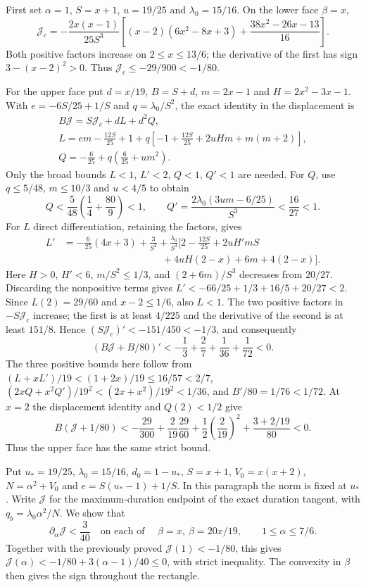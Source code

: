  First set $\alpha=1$, $S=x+1$,
$u=19/25$ and $\lambda_0=15/16$. On the lower face $\beta=x$,
\[
 \mathcal J_c=-\frac{2x(x-1)}{25S^3}
 \left[(x-2)(6x^2-8x+3)+\frac{38x^2-26x-13}{16}\right].
\]
Both positive factors increase on $2\le x\le13/6$; the derivative of the first
has sign $3-(x-2)^2>0$. Thus $\mathcal J_c\le-29/900<-1/80$.

For the upper face put $d=x/19$, $B=S+d$, $m=2x-1$ and
$H=2x^2-3x-1$. With $e=-6S/25+1/S$ and $q=\lambda_0/S^2$, the exact
identity in the displacement is
\begin{gather*}
 B\mathcal J=S\mathcal J_c+dL+d^2Q,\\
 L=em-\frac{12S}{25}+1
       +q\left[-1+\frac{12S}{25}+2uHm+m(m+2)\right],\\
 Q=-\frac6{25}+q\left(\frac6{25}+um^2\right).
\end{gather*}
Only the broad bounds $L<1$, $L'<2$, $Q<1$, $Q'<1$ are needed.
For $Q$, use $q\le5/48$, $m\le10/3$ and $u<4/5$ to obtain
\[
 Q<\frac5{48}\left(\frac14+\frac{80}{9}\right)<1,
 \qquad Q'=\frac{2\lambda_0(3um-6/25)}{S^3}<\frac{16}{27}<1.
\]
For $L$ direct differentiation, retaining the factors, gives
\begin{align*}
 L'&=-\frac6{25}(4x+3)+\frac3{S^2}
 +\frac{\lambda_0}{S^3}
   \bigl[2-\frac{12S}{25}+2uH'mS\\
 &\hspace{10em}+4uH(2-x)+6m+4(2-x)\bigr].
\end{align*}
Here $H>0$, $H'<6$, $m/S^2\le1/3$, and $(2+6m)/S^3$ decreases from $20/27$.
Discarding the nonpositive terms gives
$L'<-66/25+1/3+16/5+20/27<2$.
Since $L(2)=29/60$ and $x-2\le1/6$, also $L<1$.
The two positive factors in $-S\mathcal J_c$ increase; the first is at least $4/225$
and the derivative of the second is at least $151/8$.
Hence $(S\mathcal J_c)'<-151/450<-1/3$, and consequently
\[
 (B\mathcal J+B/80)'
 <-\frac13+\frac27+\frac1{36}+\frac1{72}<0.
\]
The three positive bounds here follow from
$(L+xL')/19<(1+2x)/19\le16/57<2/7$,
$(2xQ+x^2Q')/19^2<(2x+x^2)/19^2<1/36$, and $B'/80=1/76<1/72$.
At $x=2$ the displacement identity and $Q(2)<1/2$ give
\[
 B(\mathcal J+1/80)
 <-\frac{29}{300}+\frac2{19}\frac{29}{60}
      +\frac12\left(\frac2{19}\right)^2+\frac{3+2/19}{80}<0.
\]
Thus the upper face has the same strict bound.


Put $u_*=19/25$, $\lambda_0=15/16$, $d_0=1-u_*$,
$S=x+1$, $V_0=x(x+2)$, $N=\alpha^2+V_0$ and
$e=S(u_*-1)+1/S$. In this paragraph the norm is fixed at $u_*$.
Write $\mathcal J$ for the maximum-duration endpoint of the exact duration tangent,
with $q_b=\lambda_0\alpha^2/N$. We show that
\[
 \partial_\alpha\mathcal J<\frac3{40}
 \quad\text{on each of }\quad \beta=x,\ \beta=20x/19,
 \qquad 1\le\alpha\le7/6.
\]
Together with the previously proved $\mathcal J(1)<-1/80$, this gives
$\mathcal J(\alpha)<-1/80+3(\alpha-1)/40\le0$, with strict inequality.
The convexity in $\beta$ then gives the sign throughout the rectangle.

